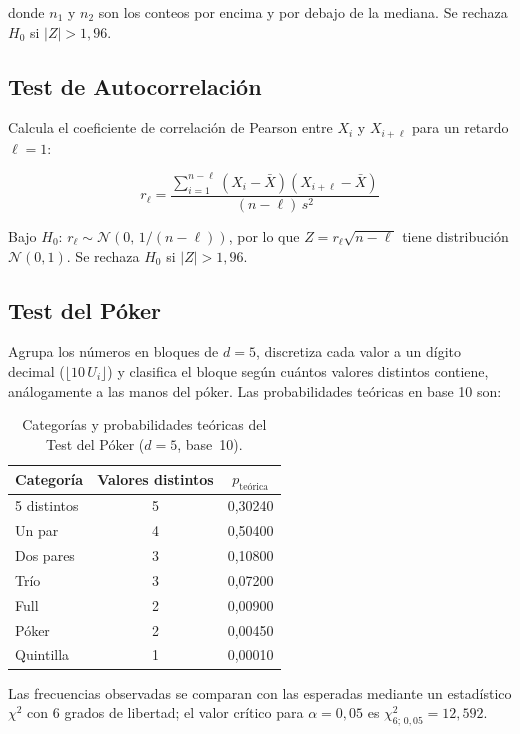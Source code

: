 \documentclass{article}
\begin{document}
donde $n_1$ y $n_2$ son los conteos por encima y por debajo de la mediana.
Se rechaza $H_0$ si $|Z| > 1{,}96$.

\subsection{Test de Autocorrelación}

Calcula el coeficiente de correlación de Pearson entre $X_i$ y
$X_{i+\ell}$ para un retardo $\ell=1$:

\begin{equation}
  r_\ell = \frac{\displaystyle\sum_{i=1}^{n-\ell}(X_i-\bar{X})(X_{i+\ell}-\bar{X})}{(n-\ell)\,s^2}
  \label{eq:autocorr}
\end{equation}

Bajo $H_0$: $r_\ell \sim \mathcal{N}(0,\,1/(n-\ell))$, por lo que
$Z = r_\ell \sqrt{n-\ell}$ tiene distribución $\mathcal{N}(0,1)$.
Se rechaza $H_0$ si $|Z| > 1{,}96$.

\subsection{Test del Póker}

Agrupa los números en bloques de $d=5$, discretiza cada valor a un dígito
decimal ($\lfloor 10\,U_i \rfloor$) y clasifica el bloque según cuántos
valores distintos contiene, análogamente a las manos del póker.  Las
probabilidades teóricas en base 10 son:

\begin{table}[H]
  \centering
  \caption{Categorías y probabilidades teóricas del Test del Póker ($d=5$, base~10).}
  \label{tab:poker}
  \begin{tabular}{lcc}
    \toprule
    Categoría & Valores distintos & $p_{\text{teórica}}$ \\
    \midrule
    5 distintos & 5 & 0{,}30240 \\
    Un par      & 4 & 0{,}50400 \\
    Dos pares   & 3 & 0{,}10800 \\
    Trío        & 3 & 0{,}07200 \\
    Full        & 2 & 0{,}00900 \\
    Póker       & 2 & 0{,}00450 \\
    Quintilla   & 1 & 0{,}00010 \\
    \bottomrule
  \end{tabular}
\end{table}

Las frecuencias observadas se comparan con las esperadas mediante un
estadístico $\chi^2$ con $6$ grados de libertad; el valor crítico para
$\alpha=0{,}05$ es $\chi^2_{6;\,0{,}05} = 12{,}592$.
\end{document}
